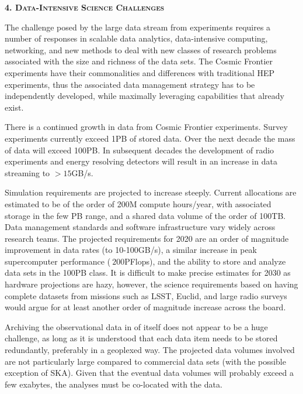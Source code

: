 \medskip

\begin{center}
{\bf\scshape{4. Data-Intensive Science Challenges}}
\end{center}


The challenge posed by the large data stream from experiments requires
a number of responses in scalable data analytics, data-intensive
computing, networking, and new methods to deal with new classes of
research problems associated with the size and richness of the data
sets. The Cosmic Frontier experiments have their commonalities and
differences with traditional HEP experiments, thus the associated data
management strategy has to be independently developed, while maximally
leveraging capabilities that already exist.

\medskip


There is a continued growth in data from Cosmic Frontier
experiments. Survey experiments currently exceed 1PB of stored
data. Over the next decade the mass of data will exceed 100PB. In
subsequent decades the development of radio experiments and energy
resolving detectors will result in an increase in data streaming to
$> 15$GB/s.

Simulation requirements are projected to increase steeply. Current
allocations are estimated to be of the order of 200M compute
hours/year, with associated storage in the few PB range, and a shared
data volume of the order of 100TB. Data management standards and
software infrastructure vary widely across research teams. The
projected requirements for 2020 are an order of magnitude improvement
in data rates (to 10-100GB/s), a similar increase in peak
supercomputer performance ($~200$PFlops), and the ability to store and
analyze data sets in the 100PB class. It is difficult to make precise
estimates for 2030 as hardware projections are hazy, however, the
science requirements based on having complete datasets from missions
such as LSST, Euclid, and large radio surveys would argue for at least
another order of magnitude increase across the board.

\medskip


Archiving the observational data in of itself does not appear to be a
huge challenge, as long as it is understood that each data item needs
to be stored redundantly, preferably in a geoplexed way. The projected
data volumes involved are not particularly large compared to
commercial data sets (with the possible exception of SKA). Given that
the eventual data volumes will probably exceed a few exabytes, the
analyses must be co-located with the data.

